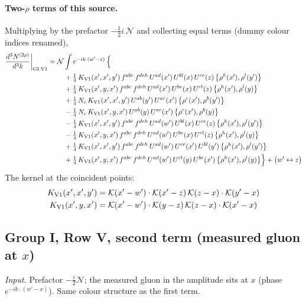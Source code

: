 \documentclass[10pt]{article}
\numberwithin{equation}{section}
\newcommand{\KK}{\mathcal K}
\newcommand{\NN}{\mathcal N}
\begin{document}
\paragraph{Two-$\rho$ terms of this source.} Multiplying by the prefactor $-\tfrac12i\,\NN$ and collecting equal terms (dummy colour indices renamed),
\begin{align}
\frac{d^3N^{(2\rho)}}{d^3k}\bigg|_{\rm GI.V1}={}&\NN\int e^{-ik\cdot(w'-z)}\,\Big\{\notag\\
&\quad +\tfrac14\,K_{\rm V1}(x',x',y')\,f^{abc}\,f^{deh}\,U^{ad}(x')\,U^{bl}(x)\,U^{ce}(z)\,\big\{\rho^{h}(x'),\rho^{l}(y')\big\}\notag\\
&\quad +\tfrac14\,K_{\rm V1}(x',y,x')\,f^{abc}\,f^{deh}\,U^{ad}(x')\,U^{be}(x)\,U^{cl}(z)\,\big\{\rho^{h}(x'),\rho^{l}(y)\big\}\notag\\
&\quad +\tfrac14\,N_{c}\,K_{\rm V1}(x',x',y')\,U^{ab}(y')\,U^{ac}(x')\,\big\{\rho^{c}(x'),\rho^{b}(y')\big\}\notag\\
&\quad -\tfrac14\,N_{c}\,K_{\rm V1}(x',y,x')\,U^{ab}(y)\,U^{ac}(x')\,\big\{\rho^{c}(x'),\rho^{b}(y)\big\}\notag\\
&\quad -\tfrac14\,K_{\rm V1}(x',x',y')\,f^{abc}\,f^{deh}\,U^{ad}(w')\,U^{bl}(x)\,U^{ce}(z)\,\big\{\rho^{h}(x'),\rho^{l}(y')\big\}\notag\\
&\quad -\tfrac14\,K_{\rm V1}(x',y,x')\,f^{abc}\,f^{deh}\,U^{ad}(w')\,U^{be}(x)\,U^{cl}(z)\,\big\{\rho^{h}(x'),\rho^{l}(y)\big\}\notag\\
&\quad +\tfrac14\,K_{\rm V1}(x',x',y')\,f^{abc}\,f^{deh}\,U^{ad}(w')\,U^{ce}(x')\,U^{bl}(y')\,\big\{\rho^{h}(x'),\rho^{l}(y')\big\}\notag\\
&\quad +\tfrac14\,K_{\rm V1}(x',y,x')\,f^{abc}\,f^{deh}\,U^{ad}(w')\,U^{cl}(y)\,U^{be}(x')\,\big\{\rho^{h}(x'),\rho^{l}(y)\big\}\Big\}+\big(w'\leftrightarrow z\big)\label{eq:res-GI.V1}
\end{align}
The kernel at the coincident points:
\begin{align*}
K_{\rm V1}(x',x',y')&=\KK(x'-w')\cdot\KK(x'-z)\,\KK(z-x)\cdot\KK(y'-x)\\K_{\rm V1}(x',y,x')&=\KK(x'-w')\cdot\KK(y-z)\,\KK(z-x)\cdot\KK(x'-x)
\end{align*}
\subsection{Group I, Row V, second term (measured gluon at $x$)}\label{sec:GI.V2}
\emph{Input.} Prefactor $-\frac i2\NN$; the measured gluon in the amplitude sits at $x$ (phase $e^{-ik\cdot(w'-x)}$). Same colour structure as the first term.
\end{document}
